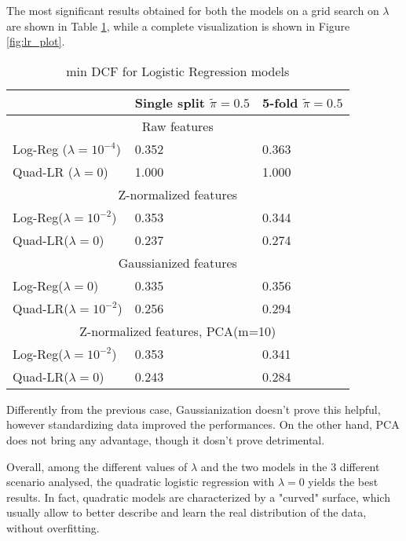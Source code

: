 The most significant results obtained for both the models on a grid search on $\lambda$ are shown in Table \ref{tab:lr_res}, while a complete visualization is shown in Figure \ref{fig:lr_plot}.
\noindent
\begin{table}[H]
	\hspace{-.2cm}
	\begin{tabular}{ p{3.15cm} p{2cm} p{1.5cm}  }
		\hline
		\hline
		& \makecell{\textbf{Single split} \\ $\tilde{\pi} = 0.5$} & \makecell{\textbf{5-fold} \\ $\tilde{\pi} = 0.5$} \\
		\hline
		\multicolumn{3}{c}{Raw features} \\
		\hline
		Log-Reg ($\lambda=10^{-4}$) & 0.352 & 0.363 \\
		Quad-LR ($\lambda=0$)       & 1.000 & 1.000\\
		\hline
		\multicolumn{3}{c}{Z-normalized features} \\
		\hline
		Log-Reg($\lambda=10^{-2}$)& 0.353 & 0.344 \\
		Quad-LR($\lambda=0$) & \boxit{red}{1.3in}0.237 &  0.274 \\	
		\hline
		\multicolumn{3}{c}{Gaussianized features} \\
		\hline
		Log-Reg($\lambda=0$) & 0.335 & 0.356 \\
		Quad-LR($\lambda=10^{-2}$) & 0.256 & 0.294  \\	
		\hline
		\multicolumn{3}{c}{Z-normalized features, PCA(m=10)} \\
		\hline
		Log-Reg($\lambda=10^{-2}$) & 0.353 & 0.341  \\
		Quad-LR($\lambda=0$) 	   & 0.243 & 0.284 \\	
		\hline
	\end{tabular}
	\caption{min DCF for Logistic Regression models}
	\label{tab:lr_res}
\end{table}

Differently from the previous case, Gaussianization doesn't prove this helpful, however standardizing data improved the performances. On the other hand, PCA does not bring any advantage, though it dosn't prove detrimental.

Overall, among the different values of $\lambda$ and the two models in the 3 different scenario analysed, the quadratic logistic regression with $\lambda=0$ yields the best results. In fact, quadratic models are characterized by a "curved" surface, which usually allow to better describe and learn the real distribution of the data, without overfitting.

